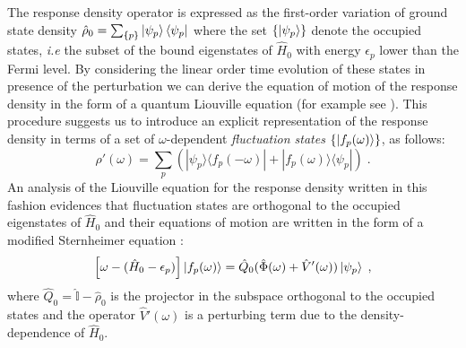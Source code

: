 \documentclass[reprint,aps,prb]{revtex4-1}
\newcommand{\eps}{\epsilon}
\newcommand{\be}{\begin{equation}}
\newcommand{\ee}{\end{equation}}
\newcommand{\lb}{\label}
\newcommand{\op}[1]{\hat {#1}}
\newcommand{\ketbra}[2]{| #1 \rangle \langle #2 |}
\newcommand{\dmnot}{\op{\rho}_0}
\newcommand{\dm}{\op{\rho}}
\newcommand{\hnot}{\op{H}_0}
\newcommand{\identity}{\op{\mathbb I}}
\begin{document}
The response density operator is expressed as the first-order variation of ground state density $\dmnot = \sum_{\{p\}} \ket{\psi_p} \bra{\psi_p}$
where the set $\{\ket{\psi_p}\}$ denote the occupied states, \emph{i.e} the subset of the bound eigenstates of $\hnot$ with energy $\eps_p$ lower than the Fermi level.
By considering the linear order time evolution of these states in presence of the perturbation we can derive the equation of motion of the response density in the form of 
a quantum Liouville equation (for example see \cite{baroni2008}). This procedure suggests us to introduce an explicit representation of the response density in terms of a set of 
$\omega$-dependent \emph{fluctuation states} $\{\ket{f_p(\omega)}\}$, as follows: 
\be\lb{rhoPrimeFluctuationStateDef1}
\dm'(\omega) = \sum_p\left(\ketbra{\psi_p}{f_p(-\omega)} + \ketbra{f_p(\omega)}{\psi_p}\right) \;.
\ee
An analysis of the Liouville equation for the response density written in this fashion evidences that fluctuation states are orthogonal to the occupied eigenstates 
of $\hnot$ and their equations of motion are written in the form of a modified Sternheimer equation \cite{mahan1980}:
\be\lb{fluctuationStateEqMotion1}
\left[\omega - (\hnot-\eps_p)\right]\ket{f_p(\omega)} = \op Q_0(\op\Phi(\omega)+\op V'(\omega))\ket{\psi_p} \;,
\ee
where $\op Q_0=\identity-\dmnot$ is the projector in the subspace orthogonal to the occupied states and the operator $\op V'(\omega)$ is a perturbing term due to the density-dependence 
of $\hnot$. %
\end{document}
